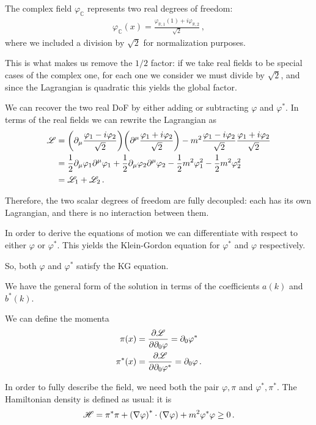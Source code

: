 \documentclass[main.tex]{subfiles}
\begin{document}
The complex field \(\varphi_{\mathbb{C}}\) represents two real degrees of freedom: 
%
\begin{align}
\varphi_{\mathbb{C}} (x) = \frac{\varphi_{\mathbb{R}, 1}(1) + i \varphi_{\mathbb{R}, 2}}{\sqrt{2}}
\,,
\end{align}
%
where we included a division by \(\sqrt{2}\) for normalization purposes.

This is what makes us remove the \(1/2\) factor: if we take real fields to be special cases of the complex one, for each one we consider we must divide by \(\sqrt{2}\), and since the Lagrangian is quadratic this yields the global factor. 

We can recover the two real DoF by either adding or subtracting  \(\varphi \) and \(\varphi^{*}\). 
In terms of the real fields we can rewrite the Lagrangian as 
%
\begin{align}
\mathscr{L} &= \qty(\partial_{\mu } \frac{\varphi_1 -i \varphi_2 }{\sqrt{2}})
\qty(\partial^{\mu } \frac{\varphi_1 +i \varphi_2 }{\sqrt{2}})
- m^2 \frac{\varphi_1 -i \varphi_2 }{\sqrt{2}} \frac{\varphi_1 + i \varphi_2 }{\sqrt{2}}  \\
&= \frac{1}{2} \partial_{\mu } \varphi_1 \partial^{\mu } \varphi_1 
+ \frac{1}{2} \partial_{\mu } \varphi_2 \partial^{\mu } \varphi_2 
- \frac{1}{2} m^2 \varphi_1^2 - \frac{1}{2} m^2 \varphi_2^2  \\
&= \mathscr{L}_{1} + \mathscr{L}_{2}
\,.
\end{align}

Therefore, the two scalar degrees of freedom are fully decoupled: each has its own Lagrangian, and there is no interaction between them.

In order to derive the equations of motion we can differentiate with respect to either \(\varphi \) or \(\varphi^{*}\). This yields the Klein-Gordon equation for \(\varphi^{*}\) and \(\varphi \) respectively. 

So, both \(\varphi \) and \(\varphi^{*}\) satisfy the KG equation. 

We have the general form of the solution in terms of the coefficients \(a(k)\) and \(b^{*}(k)\).

We can define the momenta 
%
\begin{align}
\pi (x) &= \pdv{\mathscr{L}}{\partial_0 \varphi} = \partial_{0} \varphi^{*}  \\
\pi^{*} (x) &= \pdv{\mathscr{L}}{\partial_0 \varphi^{*}} = \partial_{0} \varphi  
\,.
\end{align}

In order to fully describe the field, we need both the pair \(\varphi, \pi  \) and \(\varphi^{*}, \pi^{*}\). 
The Hamiltonian density is defined as usual: it is 
%
\begin{align}
\mathscr{H} = \pi^{* } \pi + \qty(\nabla \varphi )^{*} \cdot \qty(\nabla \varphi ) + m^2\varphi^{*} \varphi \geq 0
\,.
\end{align}
\end{document}
